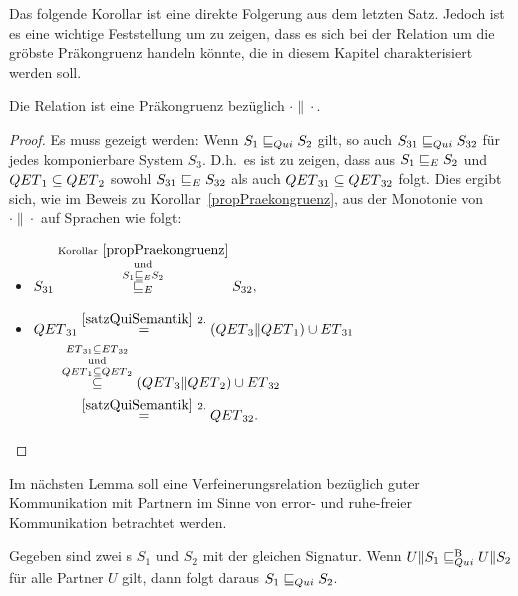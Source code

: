 Das folgende Korollar ist eine direkte Folgerung aus dem letzten Satz.
Jedoch ist es eine wichtige Feststellung um zu zeigen, dass es sich bei der
Relation \QRel{} um die gröbste Präkongruenz handeln könnte, die in diesem
Kapitel charakterisiert werden soll.

\begin{kor}
\label{propQuiPrae}
  Die Relation \QRel{} ist eine Präkongruenz bezüglich $\cdot\|\cdot$.
\end{kor}

\begin{proof}
  Es muss gezeigt werden: Wenn $S_1\sqsubseteq _{Qui} S_2$ gilt, so auch
  $S_{31}\sqsubseteq _{Qui} S_{32}$ für jedes komponierbare System $S_3$. D.h.\ es ist zu zeigen, dass aus
  $S_1\sqsubseteq _E S_2$ und $QET{}_1\subseteq QET{}_2$ sowohl $S_{31}\sqsubseteq _E S_{32}$ als
  auch $QET{}_{31}\subseteq QET{}_{32}$ folgt. Dies ergibt sich, wie im Beweis
  zu Korollar~\ref{propPraekongruenz}, aus der Monotonie von $\cdot\|\cdot$
  auf Sprachen wie folgt:
  \begin{itemize}
    \item $\begin{aligned}[t]
        S_{31} \overset{\mathrm{Korollar}
        ~\ref{propPraekongruenz}}{\overset{\mathrm{und}}{\overset{S_1\sqsubseteq _E
    S_2}{\sqsubseteq _E}}} S_{32},
    \end{aligned}$
    \item $\begin{aligned}[t]
        \QT{}_{31} &\overset{\ref{satzQuiSemantik}~2.}{=}
        (\QT{}_3\|\QT{}_1)\cup \ET{}_{31}\\
        &\hspace{-0.5cm}\overset{\ET{}_{31}\subseteq
      \ET{}_{32}}{\overset{\mathrm{und}}{\overset{\QT{}_1\subseteq
      \QT{}_2}{\subseteq}}} (\QT{}_3\|\QT{}_2) \cup \ET{}_{32}\\
        &\overset{\ref{satzQuiSemantik}~2.}{=} \QT{}_{32}.
    \end{aligned}$
  \end{itemize}
\end{proof}

Im nächsten Lemma soll eine Verfeinerungsrelation bezüglich guter Kommunikation
mit Partnern im Sinne von error- und ruhe-freier Kommunikation betrachtet
werden.

\begin{lem}
\label{lemQuiVerfeinerung}
  Gegeben sind zwei \EIO{}s $S_1$ und $S_2$ mit der gleichen Signatur. Wenn
  $U\|S_1\sqsubseteq _{Qui}^\mathrm{B} U\|S_2$ für alle Partner $U$ gilt, dann folgt daraus $S_1\sqsubseteq _{Qui}
  S_2$.
\end{lem}

